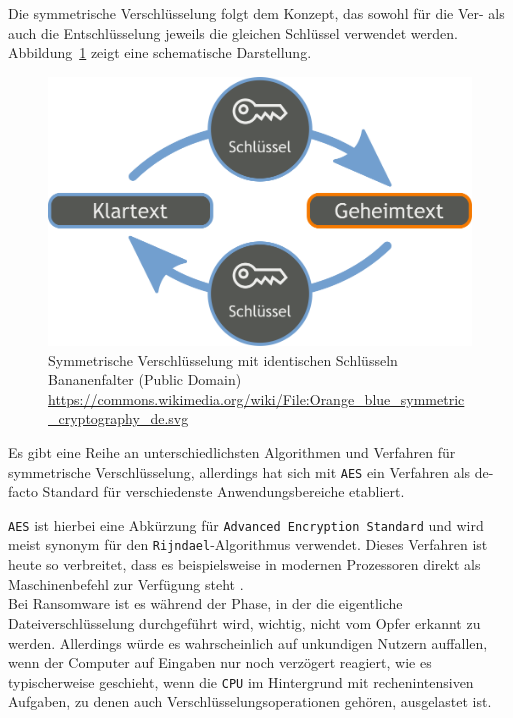 \label{sec:sym_verschl}

Die symmetrische Verschlüsselung folgt dem Konzept, das sowohl für die Ver- als auch die Entschlüsselung jeweils die gleichen Schlüssel verwendet werden. \\
Abbildung~\ref{fig:sym_verschl} zeigt eine schematische Darstellung.

\begin{figure}[h!]
	\centering
	\includegraphics[scale=0.22]{img/SymKrypto.png}
	\caption{Symmetrische Verschlüsselung mit identischen Schlüsseln \\
	Bananenfalter (Public Domain) \\ \url{https://commons.wikimedia.org/wiki/File:Orange_blue_symmetric_cryptography_de.svg}
	}
	\label{fig:sym_verschl}
	\end{figure}

Es gibt eine Reihe an unterschiedlichsten Algorithmen und Verfahren für symmetrische Verschlüsselung, allerdings hat sich mit \texttt{AES} ein Verfahren als de-facto Standard für verschiedenste Anwendungsbereiche etabliert.

\texttt{AES} ist hierbei eine Abkürzung für \texttt{Advanced Encryption Standard} und wird meist synonym für den \texttt{Rijndael}-Algorithmus verwendet. Dieses Verfahren ist heute so verbreitet, dass es beispielsweise in modernen Prozessoren direkt als Maschinenbefehl zur Verfügung steht \cite{crypto:aes_intel}. 
\\

Bei Ransomware ist es während der Phase, in der die eigentliche Dateiverschlüsselung durchgeführt wird, wichtig, nicht vom Opfer erkannt zu werden. Allerdings würde es wahrscheinlich auf unkundigen Nutzern auffallen, wenn der Computer auf Eingaben nur noch verzögert reagiert, wie es typischerweise geschieht, wenn die \texttt{CPU} im Hintergrund mit rechenintensiven Aufgaben, zu denen auch Verschlüsselungsoperationen gehören, ausgelastet ist.

